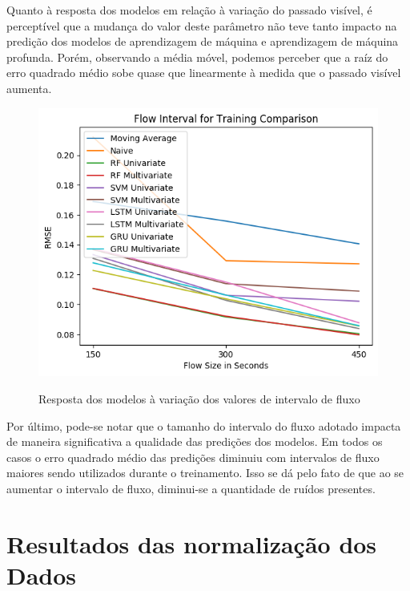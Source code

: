 Quanto à resposta dos modelos em relação à variação do passado visível, é perceptível que a mudança do valor deste parâmetro não teve tanto impacto na predição dos modelos de aprendizagem de máquina e aprendizagem de máquina profunda. Porém, observando a média móvel, podemos perceber que a raíz do erro quadrado médio sobe quase que linearmente à medida que o passado visível aumenta.

\begin{figure}[htbp]
    \centering
    \includegraphics[scale=0.8]{monography/img/flow_interval_for_training_comparison_rmse.png}
    \label{figure:res_flow}
    \caption{Resposta dos modelos à variação dos valores de intervalo de fluxo}
\end{figure}


Por último, pode-se notar que o tamanho do intervalo do fluxo adotado impacta de maneira significativa a qualidade das predições dos modelos. Em todos os casos o erro quadrado médio das predições diminuiu com intervalos de fluxo maiores sendo utilizados durante o treinamento. Isso se dá pelo fato de que ao se aumentar o intervalo de fluxo, diminui-se a quantidade de ruídos presentes.


\section{Resultados das normalização dos Dados}

